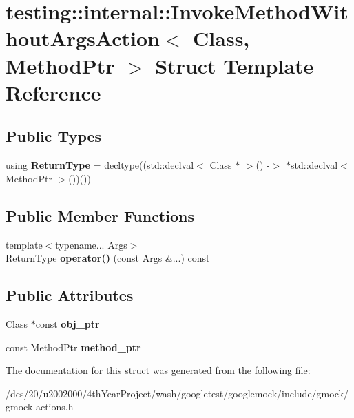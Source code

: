 \hypertarget{structtesting_1_1internal_1_1InvokeMethodWithoutArgsAction}{}\section{testing\+:\+:internal\+:\+:Invoke\+Method\+Without\+Args\+Action$<$ Class, Method\+Ptr $>$ Struct Template Reference}
\label{structtesting_1_1internal_1_1InvokeMethodWithoutArgsAction}
\subsection*{Public Types}
\begin{DoxyCompactItemize}
\item 
\mbox{\label{structtesting_1_1internal_1_1InvokeMethodWithoutArgsAction_a90be5decd74dc446b1206128c70d5304}} 
using {\bfseries Return\+Type} = decltype((std\+::declval$<$ Class $\ast$ $>$() -\/$>$ $\ast$std\+::declval$<$ Method\+Ptr $>$())())
\end{DoxyCompactItemize}
\subsection*{Public Member Functions}
\begin{DoxyCompactItemize}
\item 
\mbox{\label{structtesting_1_1internal_1_1InvokeMethodWithoutArgsAction_a1f4e57fe7516b5106374d9acda304a99}} 
{\footnotesize template$<$typename... Args$>$ }\\Return\+Type {\bfseries operator()} (const Args \&...) const
\end{DoxyCompactItemize}
\subsection*{Public Attributes}
\begin{DoxyCompactItemize}
\item 
\mbox{\label{structtesting_1_1internal_1_1InvokeMethodWithoutArgsAction_a86cc5d1b668ef7b54a84cd5151d6b952}} 
Class $\ast$const {\bfseries obj\+\_\+ptr}
\item 
\mbox{\label{structtesting_1_1internal_1_1InvokeMethodWithoutArgsAction_a4f8dea00c7921dd60381f6c70273cb9f}} 
const Method\+Ptr {\bfseries method\+\_\+ptr}
\end{DoxyCompactItemize}


The documentation for this struct was generated from the following file\+:\begin{DoxyCompactItemize}
\item 
/dcs/20/u2002000/4th\+Year\+Project/wash/googletest/googlemock/include/gmock/gmock-\/actions.\+h\end{DoxyCompactItemize}
